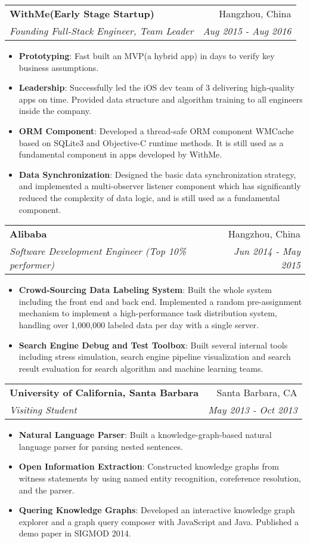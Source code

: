 \documentclass[letterpaper,9pt]{article}
\makeatletter
\newcommand{\resumeItem}[2]{
  \item\small{
    \textbf{#1}{: #2 \vspace{-2pt}}
  }
}
\newcommand{\resumeSubheading}[4]{
  \vspace{-1pt}\item
    \begin{tabular*}{0.97\textwidth}{l@{\extracolsep{\fill}}r}
      \textbf{#1} & #2 \\
      \textit{\small#3} & \textit{\small #4} \\
    \end{tabular*}\vspace{-5pt}
}
\newcommand{\resumeItemListStart}{\begin{itemize}}
\newcommand{\resumeItemListEnd}{\end{itemize}\vspace{-5pt}}
\makeatother
\begin{document}
    \resumeSubheading
      {WithMe(Early Stage Startup)}{Hangzhou, China}
      {Founding Full-Stack Engineer, Team Leader}{Aug 2015 - Aug 2016}
      \resumeItemListStart
        \resumeItem{Prototyping}
          {Fast built an MVP(a hybrid app) in days to verify key business assumptions.}
        \resumeItem{Leadership}
          {Successfully led the iOS dev team of 3 delivering high-quality apps on time. Provided data structure and  algorithm training to all engineers inside the company.}
        \resumeItem{ORM Component}
          {Developed a thread-safe ORM component WMCache based on SQLite3 and Objective-C runtime methods. It is still used as a fundamental component in apps developed by WithMe.}
        \resumeItem{Data Synchronization}
          {Designed the basic data synchronization strategy, and implemented a multi-observer listener component which has significantly reduced the complexity of data logic, and is still used as a fundamental component.}
      \resumeItemListEnd

    \resumeSubheading
      {Alibaba}{Hangzhou, China}
      {Software Development Engineer (Top 10\% performer)}{Jun 2014 - May 2015}
      \resumeItemListStart
        \resumeItem{Crowd-Sourcing Data Labeling System}
          {Built the whole system including the front end and back end. Implemented a random pre-assignment mechanism to implement a high-performance task distribution system, handling over 1,000,000 labeled data per day with a single server.}
        \resumeItem{Search Engine Debug and Test Toolbox}
          {Built several internal tools including stress simulation, search engine pipeline visualization and search result evaluation for search algorithm and machine learning teams. }
      \resumeItemListEnd

    \resumeSubheading
      {University of California, Santa Barbara}{Santa Barbara, CA}
      {Visiting Student}{May 2013 - Oct 2013}
      \resumeItemListStart
        \resumeItem{Natural Language Parser}
          {Built a knowledge-graph-based natural language parser for parsing nested sentences.}
        \resumeItem{Open Information Extraction}
          {Constructed knowledge graphs from witness statements by using named entity recognition, coreference resolution, and the parser.}
        \resumeItem{Quering Knowledge Graphs}
          {Developed an interactive knowledge graph explorer and a graph query composer with JavaScript and Java. Published a demo paper in SIGMOD 2014.}
      \resumeItemListEnd
\end{document}
